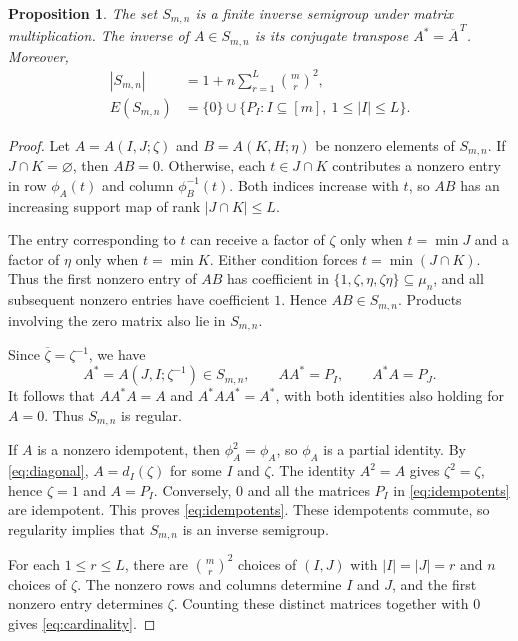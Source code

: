 \documentclass[11pt,a4paper,reqno]{amsart}
\newtheorem{proposition}[theorem]{Proposition}
\newcommand{\Sn}{S_{m,n}}
\newcommand{\E}{E}
\numberwithin{equation}{section}
\begin{document}
\begin{proposition}\label{prop:inverse}
The set $\Sn$ is a finite inverse semigroup under matrix multiplication. The inverse of $A\in\Sn$ is its conjugate transpose $A^*=\overline{A}^{\,T}$. Moreover,
\begin{align}
|\Sn| &=1+n\sum_{r=1}^{L}\binom{m}{r}^{2},\label{eq:cardinality}\\
\E(\Sn) &=\{0\}\cup\{P_I:I\subseteq[m],\ 1\leq |I|\leq L\}. \label{eq:idempotents}
\end{align}
\end{proposition}

\begin{proof}
Let $A=A(I,J;\zeta)$ and $B=A(K,H;\eta)$ be nonzero elements of $\Sn$. If $J\cap K=\varnothing$, then $AB=0$. Otherwise, each $t\in J\cap K$ contributes a nonzero entry in row $\phi_A(t)$ and column
$\phi_B^{-1}(t)$. Both indices increase with $t$, so $AB$ has an increasing support map of rank $|J\cap K|\leq L$.

The entry corresponding to $t$ can receive a factor of $\zeta$ only when $t=\min J$ and a factor of $\eta$ only when $t=\min K$. Either condition forces $t=\min(J\cap K)$. Thus the first nonzero entry of
$AB$ has coefficient in $\{1,\zeta,\eta,\zeta\eta\}\subseteq\mu_n$, and all subsequent nonzero entries have coefficient $1$. Hence $AB\in\Sn$. Products involving the zero matrix also lie in $\Sn$.

Since $\overline{\zeta}=\zeta^{-1}$, we have
$$
A^*=A(J,I;\zeta^{-1})\in\Sn,\qquad
AA^*=P_I,\qquad A^*A=P_J.
$$
It follows that $AA^*A=A$ and $A^*AA^*=A^*$, with both identities also holding for $A=0$. Thus $\Sn$ is regular.

If $A$ is a nonzero idempotent, then $\phi_A^2=\phi_A$, so $\phi_A$ is a partial identity. By \eqref{eq:diagonal}, $A=d_I(\zeta)$ for some $I$ and $\zeta$. The identity $A^2=A$ gives $\zeta^2=\zeta$, hence $\zeta=1$ and $A=P_I$. Conversely, $0$ and all the matrices $P_I$ in \eqref{eq:idempotents} are idempotent. This proves \eqref{eq:idempotents}. These idempotents commute, so regularity implies that $\Sn$ is an inverse semigroup.

For each $1\leq r\leq L$, there are $\binom{m}{r}^2$ choices of $(I,J)$ with $|I|=|J|=r$ and $n$ choices of $\zeta$. The nonzero rows and columns determine $I$ and $J$, and the first nonzero entry determines $\zeta$. Counting these distinct matrices together with $0$ gives \eqref{eq:cardinality}.
\end{proof}
\end{document}
